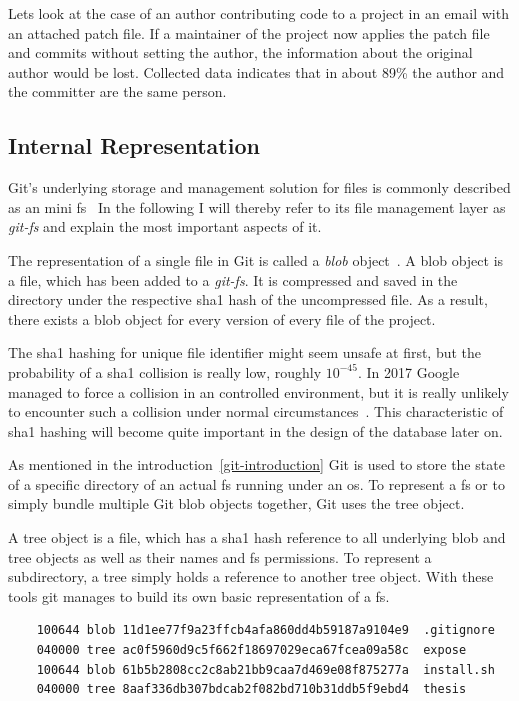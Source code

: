 Lets look at the case of an author contributing code to a project in an email with an attached patch file.
If a maintainer of the project now applies the patch file and commits without setting the author, the information about the original author would be lost.
Collected data indicates that in about 89\% the author and the committer are the same person.


\subsection{Internal Representation}
Git's underlying storage and management solution for files is commonly described as an mini \ac{fs}~\cite[p.~9]{book:pro-git}
In the following I will thereby refer to its file management layer as \emph{git-fs} and explain the most important aspects of it.

The representation of a single file in Git is called a \emph{blob} object~\cite[p.~56]{book:pro-git}.
A blob object is a file, which has been added to a \emph{git-fs}.
It is compressed and saved in the  directory under the respective \ac{sha1} hash of the uncompressed file.
As a result, there exists a blob object for every version of every file of the project.

The \ac{sha1} hashing for unique file identifier might seem unsafe at first, but the probability of a \ac{sha1} collision is really low, roughly $10^{-45}$.
In 2017 Google managed to force a collision in an controlled environment, but it is really unlikely to encounter such a collision under normal circumstances~\cite{techreport:sha-collision}.
This characteristic of \ac{sha1} hashing will become quite important in the design of the database later on.

As mentioned in the introduction~\ref{git-introduction} Git is used to store the state of a specific directory of an actual \ac{fs} running under an \ac{os}.
To represent a \ac{fs} or to simply bundle multiple Git blob objects together, Git uses the tree object.

A tree object is a file, which has a \ac{sha1} hash reference to all underlying blob and tree objects as well as their names and \ac{fs} permissions.
To represent a subdirectory, a tree simply holds a reference to another tree object.
With these tools git manages to build its own basic representation of a \ac{fs}.

\begin{verbatim}
    100644 blob 11d1ee77f9a23ffcb4afa860dd4b59187a9104e9  .gitignore
    040000 tree ac0f5960d9c5f662f18697029eca67fcea09a58c  expose
    100644 blob 61b5b2808cc2c8ab21bb9caa7d469e08f875277a  install.sh
    040000 tree 8aaf336db307bdcab2f082bd710b31ddb5f9ebd4  thesis
\end{verbatim}
\begingroup
{}
\endgroup

